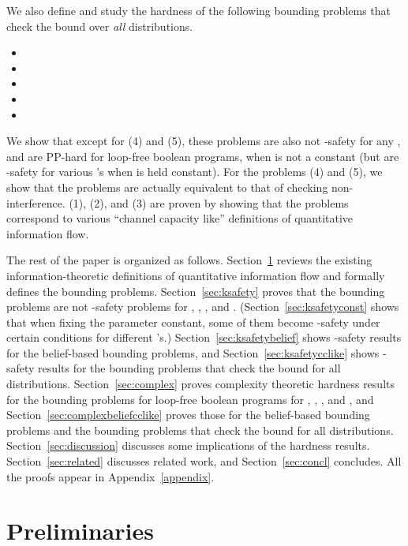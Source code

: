 \documentclass{llncs}
\begin{document}
We also define and study the hardness of the following bounding
problems that check the bound over {\em all} distributions.
\begin{itemize}
\item[(1)] 
\item[(2)] 
\item[(3)] 
\item[(4)] 
\item[(5)] 
\end{itemize}
We show that except for (4) and (5), these problems are also not
-safety for any , and are PP-hard for loop-free boolean
programs, when  is not a constant (but are -safety for various
's when  is held constant).  For the problems (4) and (5), we
show that the problems are actually equivalent to that of checking
non-interference.  (1), (2), and (3) are proven by showing that
the problems correspond to various ``channel capacity like'' definitions
of quantitative information flow.

The rest of the paper is organized as follows.
Section~\ref{sec:prelim} reviews the existing information-theoretic
definitions of quantitative information flow and formally defines the
bounding problems.  Section~\ref{sec:ksafety} proves that the bounding
problems are not -safety problems for , ,
, and .  (Section~\ref{sec:ksafetyconst} shows
that when fixing the parameter  constant, some of them become
-safety under certain conditions for different 's.)
Section~\ref{sec:ksafetybelief} shows -safety results for the
belief-based bounding problems, and Section~\ref{sec:ksafetycclike}
shows -safety results for the bounding problems that check the
bound for all distributions.  Section~\ref{sec:complex} proves
complexity theoretic hardness results for the bounding problems for
loop-free boolean programs for , , , and , and Section~\ref{sec:complexbeliefcclike}
proves those for the belief-based bounding problems and the bounding
problems that check the bound for all distributions.
Section~\ref{sec:discussion} discusses some implications of the
hardness results.  Section~\ref{sec:related} discusses related work,
and Section~\ref{sec:concl} concludes.  All the proofs appear in
Appendix~\ref{appendix}.

\section{Preliminaries}

\label{sec:prelim}
\end{document}
